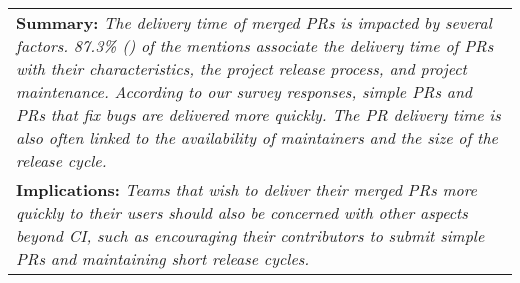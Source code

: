 \begin{center}
	\begin{tabular}{|p{}|}
		\hline
		\textbf{Summary:}
		\textit{The delivery time of merged PRs is impacted by several factors. 87.3\% (\nicefrac{579}{663}) of the mentions associate the delivery time of PRs with their characteristics, the project release process, and project maintenance. According to our survey responses, simple PRs and PRs that fix bugs are delivered more quickly. The PR delivery time is also often linked to the availability of maintainers and the size of the release cycle.} \\
		\textbf{Implications:}
		\textit{Teams that wish to deliver their merged PRs more quickly to their users should also be concerned with other aspects beyond CI, such as encouraging their contributors to submit simple PRs and maintaining short release cycles.}
		\\
		\hline
	\end{tabular}
\end{center}